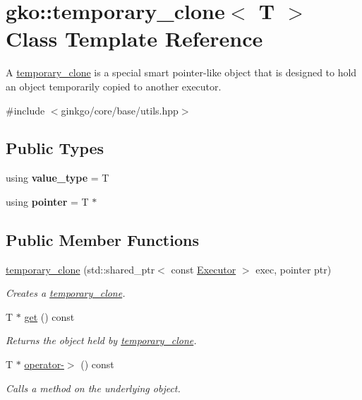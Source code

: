 \hypertarget{classgko_1_1temporary__clone}{}\section{gko\+:\+:temporary\+\_\+clone$<$ T $>$ Class Template Reference}
\label{classgko_1_1temporary__clone}


A \hyperlink{classgko_1_1temporary__clone}{temporary\+\_\+clone} is a special smart pointer-\/like object that is designed to hold an object temporarily copied to another executor.  




{\ttfamily \#include $<$ginkgo/core/base/utils.\+hpp$>$}

\subsection*{Public Types}
\begin{DoxyCompactItemize}
\item 
\mbox{\label{classgko_1_1temporary__clone_a2f2b1cb12c1b32666695d9ac90b8a795}} 
using {\bfseries value\+\_\+type} = T
\item 
\mbox{\label{classgko_1_1temporary__clone_a76f3d8f1dd6170d4063a56144794e881}} 
using {\bfseries pointer} = T $\ast$
\end{DoxyCompactItemize}
\subsection*{Public Member Functions}
\begin{DoxyCompactItemize}
\item 
\hyperlink{classgko_1_1temporary__clone_a73b2e7db31555df95b827625f85da4be}{temporary\+\_\+clone} (std\+::shared\+\_\+ptr$<$ const \hyperlink{classgko_1_1Executor}{Executor} $>$ exec, pointer ptr)
\begin{DoxyCompactList}\small\item\em Creates a \hyperlink{classgko_1_1temporary__clone}{temporary\+\_\+clone}. \end{DoxyCompactList}\item 
T $\ast$ \hyperlink{classgko_1_1temporary__clone_a38042e39a039070cc97e225435d5ed9e}{get} () const
\begin{DoxyCompactList}\small\item\em Returns the object held by \hyperlink{classgko_1_1temporary__clone}{temporary\+\_\+clone}. \end{DoxyCompactList}\item 
T $\ast$ \hyperlink{classgko_1_1temporary__clone_a007bc247a9a250dcec8cdadb54710106}{operator-\/$>$} () const
\begin{DoxyCompactList}\small\item\em Calls a method on the underlying object. \end{DoxyCompactList}\end{DoxyCompactItemize}


